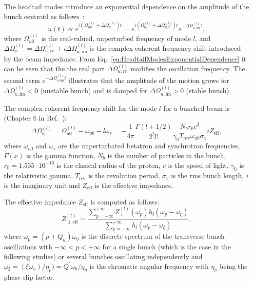 The headtail modes introduce an exponential dependence on the amplitude of the bunch centroid as follows~\cite{Schenk:2665819}:
\begin{equation}\label{eq:HeadtailModesExponentialDependence}
    u(t) \propto e^{i(\Omega_{u0}^{(l)}+\Delta \Omega_u^{(l)})t} =  e^{i(\Omega_{u,0}^{(l)}+\Delta \Omega_{u, \mathrm{{re}}}^{(l)})t} e^{-\Delta \Omega_{u, \mathrm{{im}}}^{(l)} t},
\end{equation}
where $\Omega_{u0}^{(l)}$ is the real-valued, unperturbed frequency of mode $l$, and $\Delta \Omega_u ^{(l)} = \Delta \Omega_{u, \mathrm{re}}^{(l)} + i \Delta \Omega_{u, \mathrm{im}}^{(l)}$ is the complex coherent frequency shift introduced by the beam impedance. From Eq.~\eqref{eq:HeadtailModesExponentialDependence} it can be seen that the the real part $\Delta \Omega_{u, \mathrm{re}}^{(l)}$ modifies the oscillation frequency. The second term $e^{-\Delta \Omega_{u, \mathrm{im}}^{(l)}t}$ illustrates that the amplitude of the motion grows for $\Delta \Omega_{u, \mathrm{im}}^{(l)}<0$ (unstable bunch) and is damped for $\Delta \Omega_{u, \mathrm{im}}^{(l)}>0$ (stable bunch).


The complex coherent frequency shift for the mode $l$ for a bunched beam is (Chapter 6 in Ref.~\cite{Chao:collective}): %
\begin{equation}\label{eq:complext_tune_shift_modes_m}
    \Delta \Omega_u ^{(l)}= \Omega_{u0}^{(l)}-\omega_{u0}-l\omega_s = -\frac{1}{4\pi}\frac{\Gamma(l+1/2)}{2^l l!}\frac{N_b r_0 c^2}{\gamma_0 T_\mathrm{rev} \omega_{u0} \sigma_z} i Z_\mathrm{eff},
\end{equation}
where $\omega_{u0}$ and $\omega_s$ are the unperturbated betatron and synchrotron frequencies, $\Gamma(x)$ is the gamma function, $N_b$ is the number of particles in the bunch, $r_0=1.535 \cdot 10^{-16}$ is the clasical radius of the proton, $c$ is the speed of light, $\gamma_0$ is the relativistic gamma, $T_\mathrm{rev}$ is the revolution period, $\sigma_z$ is the rms bunch length, $i$ is the imaginary unit and $Z_\mathrm{eff}$ is the effective impedance.

The effective impedance $Z_\mathrm{eff}$ is computed as follows:
\begin{equation}\label{eq:effective_impedance}
    Z_{\perp \mathrm{eff}}^{(l)} = \frac{\sum_{p=-\infty}^{+ \infty}Z_{\perp }^{(l)}(\omega_{p}) h_l(\omega_{p}-\omega_\xi)}{\sum_{p=-\infty}^{+ \infty}h_l(\omega_{p}-\omega_\xi)},
\end{equation}
where $\omega_p = (p+Q_u)\omega_0$ is the discrete spectrum of the transverse bunch oscillations with $-\infty < p < + \infty$ for a single bunch (which is the case in the following studies) or several bunches oscillating independently and $\omega_\xi=(\xi \omega_u)/\eta_p) = Q^\prime \omega_0 / \eta_p$ is the chromatic angular frequency with $\eta_p$ being the phase slip factor.

